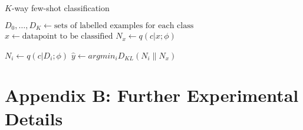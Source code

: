 \documentclass{article} \usepackage{iclr2017_conference,times}
\newcommand{\KL}[2]{D_{KL} \left (#1 \| #2 \right )}
\begin{document}
    \begin{algorithm}[H]
    \caption{$K$-way few-shot classification} 
    \label{alg:fewshot}
    \begin{algorithmic}
       \STATE $D_0, \dots, D_K \gets \text{sets of labelled examples for each class}$
        \STATE $x \gets \text{datapoint to be classified}$
        \STATE $N_x \gets q(c | x ; \phi)$

        \STATE $N_i \gets q(c | D_i; \phi)$
        \ENDFOR
        \STATE $\hat{y} \gets argmin_{i} \KL{N_i}{N_x}$
    \end{algorithmic}
\end{algorithm}
\section{Appendix B: Further Experimental Details}
\label{appendix:experimental_details}
\end{document}
